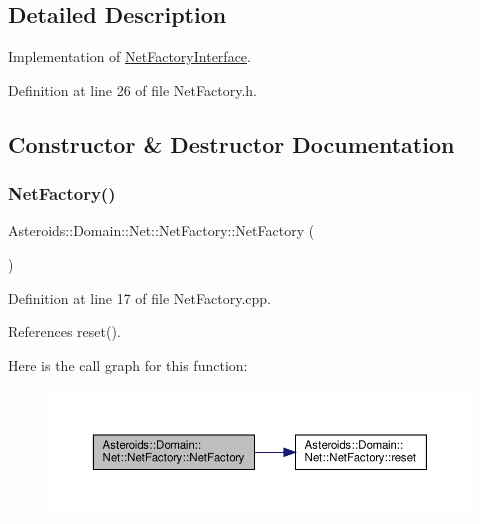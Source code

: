 \subsection{Detailed Description}
Implementation of \hyperlink{classAsteroids_1_1Domain_1_1Net_1_1NetFactoryInterface}{Net\+Factory\+Interface}. 

Definition at line 26 of file Net\+Factory.\+h.



\subsection{Constructor \& Destructor Documentation}
\mbox{\label{classAsteroids_1_1Domain_1_1Net_1_1NetFactory_ab5717fbd5dd1c35e1b7af78cb01269cc}} 
\subsubsection{\texorpdfstring{Net\+Factory()}{NetFactory()}}
{\footnotesize\ttfamily Asteroids\+::\+Domain\+::\+Net\+::\+Net\+Factory\+::\+Net\+Factory (\begin{DoxyParamCaption}{ }\end{DoxyParamCaption})}



Definition at line 17 of file Net\+Factory.\+cpp.



References reset().

Here is the call graph for this function\+:\nopagebreak
\begin{figure}[H]
\begin{center}
\leavevmode
\includegraphics[width=350pt]{classAsteroids_1_1Domain_1_1Net_1_1NetFactory_ab5717fbd5dd1c35e1b7af78cb01269cc_cgraph}
\end{center}
\end{figure}


